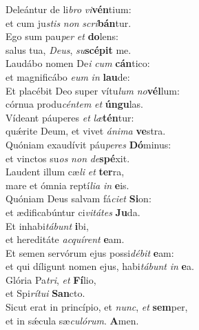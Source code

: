 \oddverse Deleántur de li\textit{bro} \textit{vi}\textbf{vén}tium:~\*\\
\oddverse et cum ju\textit{stis} \textit{non} \textit{scri}\textbf{bán}tur.\\
\evenverse Ego sum pau\textit{per} \textit{et} \textbf{do}lens:~\*\\
\evenverse salus tua, \textit{De}\textit{us}, \textit{su}\textbf{scé}\textbf{pit} me.\\
\oddverse Laudábo nomen De\textit{i} \textit{cum} \textbf{cán}tico:~\*\\
\oddverse et magnificábo \textit{e}\textit{um} \textit{in} \textbf{lau}de:\\
\evenverse Et placébit Deo super vítu\textit{lum} \textit{no}\textbf{vél}lum:~\*\\
\evenverse córnua produ\textit{cén}\textit{tem} \textit{et} \textbf{ún}\textbf{gu}las.\\
\oddverse Vídeant páuperes \textit{et} \textit{læ}\textbf{tén}tur:~\*\\
\oddverse quǽrite Deum, et vivet \textit{á}\textit{ni}\textit{ma} \textbf{ve}stra.\\
\evenverse Quóniam exaudívit páu\textit{pe}\textit{res} \textbf{Dó}minus:~\*\\
\evenverse et vinctos su\textit{os} \textit{non} \textit{de}\textbf{spé}xit.\\
\oddverse Laudent illum cæ\textit{li} \textit{et} \textbf{ter}ra,~\*\\
\oddverse mare et ómnia reptí\textit{li}\textit{a} \textit{in} \textbf{e}is.\\
\evenverse Quóniam Deus salvam fá\textit{ci}\textit{et} \textbf{Si}on:~\*\\
\evenverse et ædificabúntur ci\textit{vi}\textit{tá}\textit{tes} \textbf{Ju}da.\\
\oddverse Et inhabi\textit{tá}\textit{bunt} \textbf{i}bi,~\*\\
\oddverse et hereditáte \textit{ac}\textit{quí}\textit{rent} \textbf{e}am.\\
\evenverse Et semen servórum ejus possi\textit{dé}\textit{bit} \textbf{e}am:~\*\\
\evenverse et qui díligunt nomen ejus, habi\textit{tá}\textit{bunt} \textit{in} \textbf{e}a.\\
\oddverse Glória Pa\textit{tri}, \textit{et} \textbf{Fí}lio,~\*\\
\oddverse et Spi\textit{rí}\textit{tu}\textit{i} \textbf{San}cto.\\
\evenverse Sicut erat in princípio, et \textit{nunc}, \textit{et} \textbf{sem}per,~\*\\
\evenverse et in sǽcula sæ\textit{cu}\textit{ló}\textit{rum}. \textbf{A}men.\\
